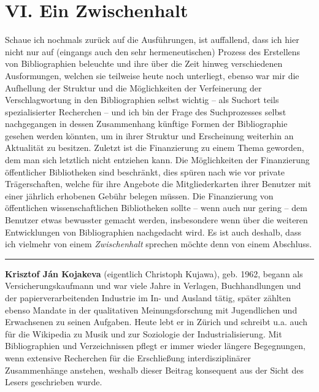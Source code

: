 \documentclass[a4paper,
fontsize=11pt,
oneside,
numbers=noperiodatend,
parskip=half-,
bibliography=totoc,
final
]{scrartcl}
\begin{document}
\section*{VI. Ein Zwischenhalt}\label{vi.-ein-zwischenhalt}

Schaue ich nochmals zurück auf die Ausführungen, ist auffallend, dass
ich hier nicht nur auf (eingangs auch den sehr hermeneutischen) Prozess
des Erstellens von Bibliographien beleuchte und ihre über die Zeit
hinweg verschiedenen Ausformungen, welchen sie teilweise heute noch
unterliegt, ebenso war mir die Aufhellung der Struktur und die
Möglichkeiten der Verfeinerung der Verschlagwortung in den
Bibliographien selbst wichtig -- als Suchort teils spezialisierter
Recherchen -- und ich bin der Frage des Suchprozesses selbst
nachgegangen in dessen Zusammenhang künftige Formen der Bibliographie
gesehen werden könnten, um in ihrer Struktur und Erscheinung weiterhin
an Aktualität zu besitzen. Zuletzt ist die Finanzierung zu einem Thema
geworden, dem man sich letztlich nicht entziehen kann. Die Möglichkeiten
der Finanzierung öffentlicher Bibliotheken sind beschränkt, dies spüren
nach wie vor private Trägerschaften, welche für ihre Angebote die
Mitgliederkarten ihrer Benutzer mit einer jährlich erhobenen Gebühr
belegen müssen. Die Finanzierung von öffentlichen wissenschaftlichen
Bibliotheken sollte -- wenn auch nur gering -- dem Benutzer etwas
bewusster gemacht werden, insbesondere wenn über die weiteren
Entwicklungen von Bibliographien nachgedacht wird. Es ist auch deshalb,
dass ich vielmehr von einem \emph{Zwischenhalt} sprechen möchte denn von
einem Abschluss.

\begin{center}\rule{0.5\linewidth}{\linethickness}\end{center}

\textbf{Krisztof Ján Kojakeva} (eigentlich Christoph Kujawa), geb. 1962,
begann als Versicherungskaufmann und war viele Jahre in Verlagen,
Buchhandlungen und der papierverarbeitenden Industrie im In- und Ausland
tätig, später zählten ebenso Mandate in der qualitativen
Meinungsforschung mit Jugendlichen und Erwachsenen zu seinen Aufgaben.
Heute lebt er in Zürich und schreibt u.a. auch für die Wikipedia zu
Musik und zur Soziologie der Industrialisierung. Mit Bibliographien und
Verzeichnissen pflegt er immer wieder längere Begegnungen, wenn
extensive Recherchen für die Erschließung interdisziplinärer
Zusammenhänge anstehen, weshalb dieser Beitrag konsequent aus der Sicht
des Lesers geschrieben wurde.
\end{document}

